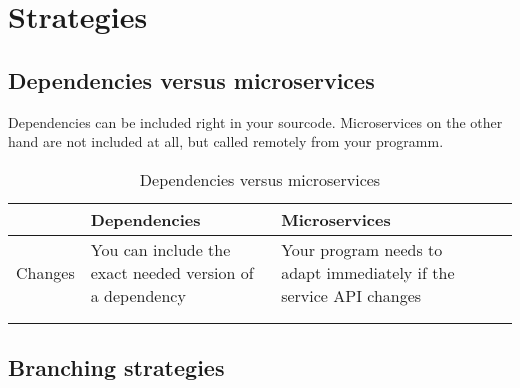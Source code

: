 \section{Strategies}

\subsection{Dependencies versus microservices}

Dependencies can be included right in your sourcode. Microservices on the other hand are not included at all, but called remotely from your programm. 


\begin{table}[h]
\centering
\caption{Dependencies versus microservices}
\begin{tabular}{@{}lllll@{}}
\toprule
        & Dependencies                                             & Microservices                                                      &  &  \\ \midrule
Changes & You can include the exact needed version of a dependency & Your program needs to adapt immediately if the service API changes &  &  \\
        &                                                          &                                                                    &  &  \\
        &                                                          &                                                                    &  &  \\ \bottomrule
\end{tabular}
\end{table}




\subsection{Branching strategies}